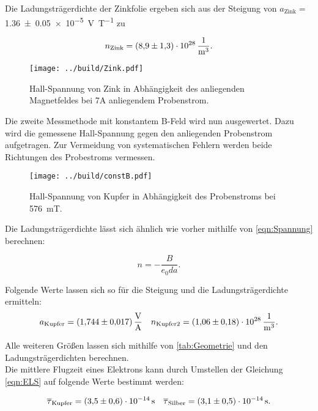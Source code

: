 \noindent Die Ladungsträgerdichte der Zinkfolie ergeben sich aus der Steigung von $a_\text{Zink}=$\qty{1.36\pm0.05e-5}{\volt\per\tesla}
zu 

\begin{equation*}
    n_\text{Zink} = \qty{8.9\pm1.3e28}{\per\cubic\meter}.
\end{equation*}

\begin{figure}[H]
    \centering
    \label{Zink}
    \texttt{[image: ../build/Zink.pdf]}
    \caption{Hall-Spannung von Zink in Abhängigkeit des anliegenden Magnetfeldes bei 7A anliegendem Probenstrom.}
\end{figure}

\noindent Die zweite Messmethode mit konstantem B-Feld wird nun ausgewertet. Dazu wird die gemessene Hall-Spannung 
gegen den anliegenden Probenstrom aufgetragen. Zur Vermeidung von systematischen Fehlern werden beide Richtungen des 
Probestroms vermessen.

\begin{figure}[H]
    \centering
    \texttt{[image: ../build/constB.pdf]}
    \caption{Hall-Spannung von Kupfer in Abhängigkeit des Probenstroms bei \qty{576}{\milli\tesla}.}
\end{figure}

\noindent Die Ladungsträgerdichte lässt sich ähnlich wie vorher mithilfe von \eqref{eqn:Spannung} berechnen:

\begin{equation*}
    n = - \frac{B}{e_0 d a}.
\end{equation*}

\noindent Folgende Werte lassen sich so für die Steigung und die Ladungsträgerdichte ermitteln:
\begin{align*}
    a_\text{Kupfer}=\qty{1.744 \pm 0.017}{\volt\per\ampere} && n_\text{Kupfer2} = \qty{1.06\pm0.18e28}{\per\cubic\meter}.
\end{align*}

\noindent Alle weiteren Größen lassen sich mithilfe von \autoref{tab:Geometrie} und den Ladungsträgerdichten 
berechnen.\\
\noindent Die mittlere Flugzeit eines Elektrons kann durch Umstellen der Gleichung \eqref{eqn:ELS} auf folgende Werte 
bestimmt werden:

\begin{align*}
    \overline\tau_\text{Kupfer} = \qty{3.5\pm0.6e-14}{\second} && \overline\tau_\text{Silber} = \qty{3.1\pm0.5e-14}{\second}.
\end{align*}

